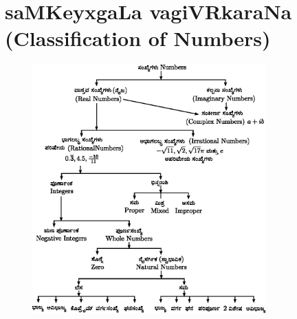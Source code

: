 \chapter*[saMKeyxgaLa vagiVRkaraNa ({\rm\bfseries Classification of Numbers})]{saMKeyxgaLa vagiVRkaraNa\\({\rm\bfseries Classification of Numbers})}

\vskip -30pt

\begin{figure}[h]
\begin{center}
\includegraphics[width=9cm]{src/figure/165.eps}
\end{center}
\end{figure}


